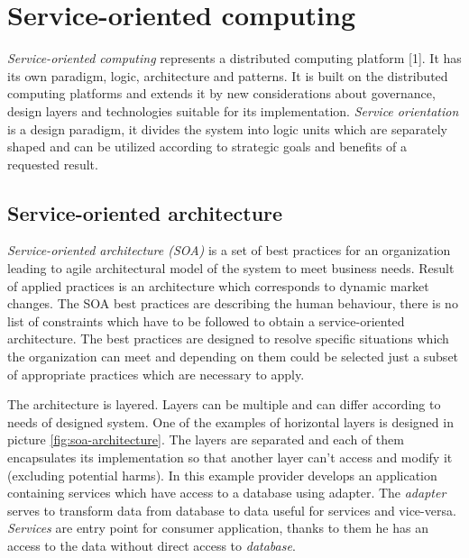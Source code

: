 \chapter{Service-oriented computing}
\label{chap:service-oriented computing}
\emph{Service-oriented computing} represents a distributed computing platform [1]. It has its own paradigm, logic, architecture and patterns. It is built on the distributed computing platforms and extends it by new considerations about governance, design layers and technologies suitable for its implementation.
\emph{Service orientation} is a design paradigm, it divides the system into logic units which are separately shaped and can be utilized according to strategic goals and benefits of a requested result.

\section{Service-oriented architecture}
\emph{Service-oriented architecture (SOA)} is a set of best practices for an organization leading to agile architectural model of the system to meet business needs. Result of applied practices is an architecture which corresponds to dynamic market changes. The SOA best practices are describing the human behaviour, there is no list of constraints which have to be followed to obtain a service-oriented architecture. The best practices are designed to resolve specific situations which the organization can meet and depending on them could be selected just a subset of appropriate practices which are necessary to apply.\par

The architecture is layered. Layers can be multiple and can differ according to needs of designed system. One of the examples of horizontal layers is designed in picture \ref{fig:soa-architecture}. The layers are separated and each of them encapsulates its implementation so that another layer can't access and modify it (excluding potential harms). In this example provider develops an application containing services which have access to a database using adapter. The \textit{\gls{adapter}} serves to transform data from database to data useful for services and vice-versa. \textit{Services} are entry point for consumer application, thanks to them he has an access to the data without direct access to \textit{database}.

